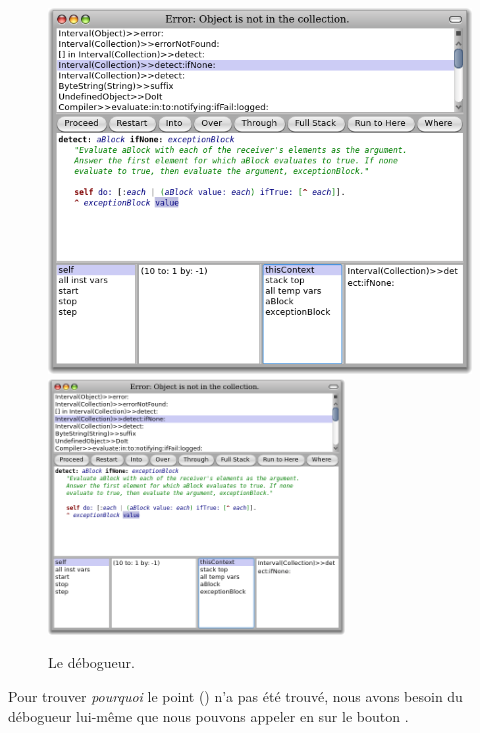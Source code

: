 \documentclass[a4paper,10pt,twoside]{book}
\begin{document}
\begin{figure}[btp]
	\begin{center}
	\ifluluelse
		{\includegraphics[width=\textwidth]{debuggerDetectIfNone}}
		{\includegraphics[width=0.7\textwidth]{debuggerDetectIfNone}}
	\end{center}
	\caption{Le débogueur.}
\end{figure}

Pour trouver \emph{pourquoi} le point () n'a pas été trouvé,
nous avons besoin du débogueur lui-même que nous pouvons appeler en
\clickant{} sur le bouton 
.

\end{document}
